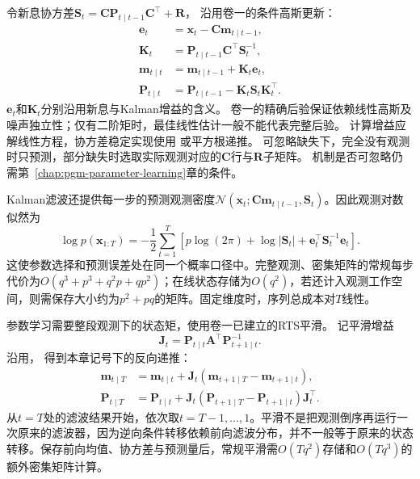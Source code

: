 令新息协方差$\bm S_t=\bm C\bm P_{t\mid t-1}\bm C^\top+\bm R$，
沿用卷一的条件高斯更新：
\begin{equation}
  \begin{aligned}
    \bm{e}_t&=\bm{x}_t-\bm{C}\bm{m}_{t\mid t-1},\\
    \bm{K}_t&=\bm{P}_{t\mid t-1}\bm{C}^{\top}\bm{S}_t^{-1},\\
    \bm{m}_{t\mid t}
      &=\bm{m}_{t\mid t-1}+\bm{K}_t\bm{e}_t,\\
    \bm{P}_{t\mid t}
      &=\bm{P}_{t\mid t-1}
        -\bm{K}_t\bm{S}_t\bm{K}_t^{\top}.
  \end{aligned}
  \label{eq:pgm-dynamic-kalman-update}
\end{equation}
$\bm e_t$和$\bm K_t$分别沿用新息与Kalman增益的含义。
卷一的精确后验保证依赖线性高斯及噪声独立性；仅有二阶矩时，最佳线性估计一般不能代表完整后验。
计算增益应解线性方程，协方差稳定实现使用
或平方根递推。
可忽略缺失下，完全没有观测时只预测，部分缺失时选取实际观测对应的$\bm C$行与$\bm R$子矩阵。
机制是否可忽略仍需第~\ref{chap:pgm-parameter-learning}章的条件。

Kalman滤波还提供每一步的预测观测密度$\mathcal N(\bm{x}_t;\bm{C}\bm{m}_{t\mid t-1},\bm{S}_t)$。因此观测对数似然为
\begin{equation}
  \log p(\bm{x}_{1:T})
    =-\frac12\sum_{t=1}^{T}
      \left[
        p\log(2\pi)+\log|\bm{S}_t|
        +\bm{e}_t^\top\bm{S}_t^{-1}\bm{e}_t
      \right].
  \label{eq:pgm-dynamic-kalman-likelihood}
\end{equation}
这使参数选择和预测误差处在同一个概率口径中。完整观测、密集矩阵的常规每步代价为$O(q^3+p^3+q^2p+qp^2)$；在线状态存储为$O(q^2)$，若还计入观测工作空间，则需保存大小约为$p^2+pq$的矩阵。固定维度时，序列总成本对$T$线性。

参数学习需要整段观测下的状态矩，使用卷一已建立的RTS平滑。
记平滑增益
\[
  \bm{J}_t=\bm{P}_{t\mid t}\bm{A}^{\top}
    \bm{P}_{t+1\mid t}^{-1}.
\]
沿用，
得到本章记号下的反向递推：
\begin{equation}
  \begin{aligned}
    \bm{m}_{t\mid T}
      &=\bm{m}_{t\mid t}
        +\bm{J}_t(\bm{m}_{t+1\mid T}
          -\bm{m}_{t+1\mid t}),\\
    \bm{P}_{t\mid T}
      &=\bm{P}_{t\mid t}
        +\bm{J}_t(\bm{P}_{t+1\mid T}
          -\bm{P}_{t+1\mid t})\bm{J}_t^\top.
  \end{aligned}
  \label{eq:pgm-dynamic-rts}
\end{equation}
从$t=T$处的滤波结果开始，依次取$t=T-1,\ldots,1$。平滑不是把观测倒序再运行一次原来的滤波器，因为逆向条件转移依赖前向滤波分布，并不一般等于原来的状态转移。保存前向均值、协方差与预测量后，常规平滑需$O(Tq^2)$存储和$O(Tq^3)$的额外密集矩阵计算。

